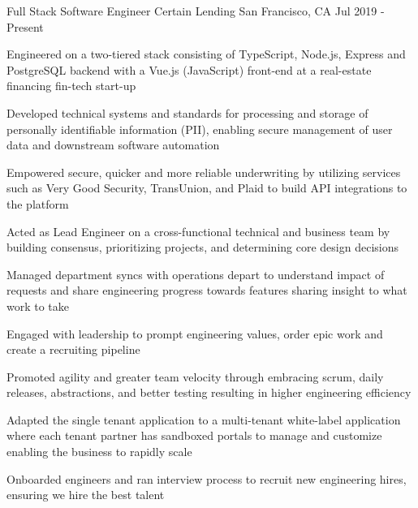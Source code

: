






\begin{cventries}

  \cventry
     {Full Stack Software Engineer}
     {Certain Lending}
     {San Francisco, CA}
     {Jul 2019 - Present}
     {
       \begin{cvitems}
			\item{Engineered on a two-tiered stack consisting of TypeScript, Node.js, Express and PostgreSQL backend with a Vue.js (JavaScript) front-end at a real-estate financing fin-tech start-up}
			\item{Developed technical systems and standards for processing and storage of personally identifiable information (PII), enabling secure management of user data and downstream software automation}
			\item{Empowered secure, quicker and more reliable underwriting by utilizing services such as Very Good Security, TransUnion, and Plaid to build API integrations to the platform}
   		\item{Acted as Lead Engineer on a cross-functional technical and business team by building consensus, prioritizing projects, and determining core design decisions}
      \item{Managed department syncs with operations depart to understand impact of requests and share engineering progress towards features sharing insight to what work to take}
      \item{Engaged with leadership to prompt engineering values, order epic work and create a recruiting pipeline}
  		\item{Promoted agility and greater team velocity through embracing scrum, daily releases, abstractions, and better testing resulting in higher engineering efficiency}
   		\item{Adapted the single tenant application to a multi-tenant white-label application where each tenant partner has sandboxed portals to manage and customize enabling the business to rapidly scale}
      \item{Onboarded engineers and ran interview process to recruit new engineering hires, ensuring we hire the best talent}

\end{cvitems}}
\end{cventries}
